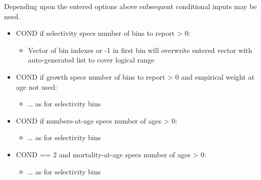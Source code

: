 Depending upon the entered options above subsequent conditional inputs may be need.
\begin{itemize}
	\item COND if selectivity specs number of bins to report > 0:
		\begin{itemize}
			\item Vector of bin indexes or -1 in first bin will overwrite entered vector with auto-generated list to cover logical range
	\end{itemize}
	\item COND if growth specs number of bins to report > 0 and empirical weight at age not used:
		\begin{itemize}
			\item … as for selectivity bins
		\end{itemize}
	\item COND if numbers-at-age specs number of ages > 0:
		\begin{itemize}
			\item … as for selectivity bins
		\end{itemize}
	\item COND == 2 and mortality-at-age specs number of ages > 0:
		\begin{itemize}
			\item … as for selectivity bins
		\end{itemize}
\end{itemize}


